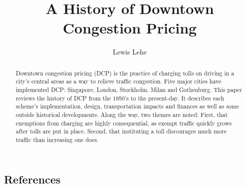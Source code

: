 \documentclass[authoryear]{elsarticle}
\begin{document}
\title{A History of Downtown Congestion Pricing}
\author[ll]{Lewis Lehe }

\address[ll]{UC Berkeley, Department of Civil and Environmental Engineering \\ lewis500@berkeley.edu \\ http://lewislehe.com}

\begin{abstract}

Downtown congestion pricing (DCP) is the practice of charging tolls on driving in a city's central areas as a way to relieve traffic congestion. Five major cities have implemented DCP: Singapore, London, Stockholm, Milan and Gothenburg. This paper reviews the history of DCP from the 1950's to the present-day. It describes each scheme's implementation, design, transportation impacts and finances as well as some outside historical developments. Along the way, two themes are noted: First, that exemptions from charging are highly consequential, as exempt traffic quickly grows after tolls are put in place. Second, that instituting a toll discourages much more traffic than increasing one does.

\end{abstract}

\maketitle













\pagebreak
\subsection*{References}


\end{document}

